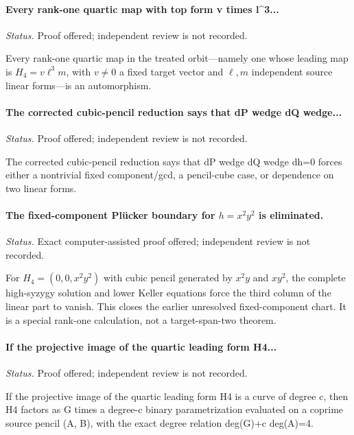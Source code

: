 \paragraph{Every rank-one quartic map with top form v times l\textasciicircum{}3...}
\emph{Status.} Proof offered; independent review is not recorded.

Every rank-one quartic map in the treated orbit---namely one whose leading
map is \(H_4=v\ell^3m\), with \(v\ne0\) a fixed target vector and
\(\ell,m\) independent source linear forms---is an automorphism.

\label{supp-note-02-008}
\paragraph{The corrected cubic-pencil reduction says that dP wedge dQ wedge...}
\emph{Status.} Proof offered; independent review is not recorded.

The corrected cubic-pencil reduction says that dP wedge dQ wedge dh=0 forces either a nontrivial fixed component/gcd, a pencil-cube case, or dependence on two linear forms.

\label{supp-note-02-009}
\paragraph{The fixed-component Pl\"ucker boundary for
\(h=x^2y^2\) is eliminated.}
\emph{Status.} Exact computer-assisted proof offered; independent review is
not recorded.

For \(H_4=(0,0,x^2y^2)\) with cubic pencil generated by \(x^2y\) and
\(xy^2\), the complete high-syzygy solution and lower Keller equations force
the third column of the linear part to vanish.  This closes the earlier
unresolved fixed-component chart.  It is a special rank-one calculation,
not a target-span-two theorem.

\label{supp-note-02-010}
\paragraph{If the projective image of the quartic leading form H4...}
\emph{Status.} Proof offered; independent review is not recorded.

If the projective image of the quartic leading form H4 is a curve of degree c, then H4 factors as G times a degree-c binary parametrization evaluated on a coprime source pencil (A, B), with the exact degree relation deg(G)+c deg(A)=4.

